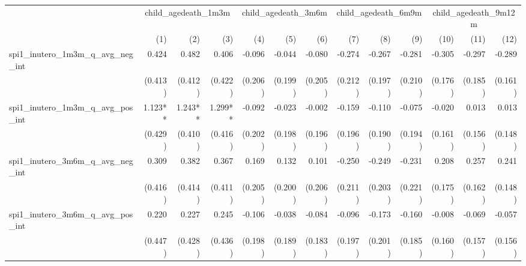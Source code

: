 \begin{tabular}{lrrrrrrrrrrrr}
\toprule
                                            &  \multicolumn{3}{c}{child\_agedeath\_1m3m} &  \multicolumn{3}{c}{child\_agedeath\_3m6m} &  \multicolumn{3}{c}{child\_agedeath\_6m9m} & \multicolumn{3}{c}{child\_agedeath\_9m12m} \\ 
\cmidrule(lr){2-4} \cmidrule(lr){5-7} \cmidrule(lr){8-10} \cmidrule(lr){11-13} 
                                            &          (1) &          (2) &          (3) &          (4) &          (5) &          (6) &          (7) &          (8) &          (9) &         (10) &         (11) &         (12) \\ 
\midrule
spi1\_inutero\_1m3m\_q\_avg\_neg\_int       &        0.424 &        0.482 &        0.406 &       -0.096 &       -0.044 &       -0.080 &       -0.274 &       -0.267 &       -0.281 &       -0.305 &       -0.297 &       -0.289 \\ 
                                            &      (0.413) &      (0.412) &      (0.422) &      (0.206) &      (0.199) &      (0.205) &      (0.212) &      (0.197) &      (0.210) &      (0.176) &      (0.185) &      (0.161) \\ 
spi1\_inutero\_1m3m\_q\_avg\_pos\_int       &      1.123** &      1.243** &      1.299** &       -0.092 &       -0.023 &       -0.002 &       -0.159 &       -0.110 &       -0.075 &       -0.020 &        0.013 &        0.013 \\ 
                                            &      (0.429) &      (0.410) &      (0.416) &      (0.202) &      (0.198) &      (0.196) &      (0.196) &      (0.190) &      (0.194) &      (0.161) &      (0.156) &      (0.148) \\ 
spi1\_inutero\_3m6m\_q\_avg\_neg\_int       &        0.309 &        0.382 &        0.367 &        0.169 &        0.132 &        0.101 &       -0.250 &       -0.249 &       -0.231 &        0.208 &        0.257 &        0.241 \\ 
                                            &      (0.416) &      (0.414) &      (0.411) &      (0.205) &      (0.200) &      (0.206) &      (0.211) &      (0.203) &      (0.221) &      (0.175) &      (0.162) &      (0.148) \\ 
spi1\_inutero\_3m6m\_q\_avg\_pos\_int       &        0.220 &        0.227 &        0.245 &       -0.106 &       -0.038 &       -0.084 &       -0.096 &       -0.173 &       -0.160 &       -0.008 &       -0.069 &       -0.057 \\ 
                                            &      (0.447) &      (0.428) &      (0.436) &      (0.198) &      (0.189) &      (0.183) &      (0.197) &      (0.201) &      (0.185) &      (0.160) &      (0.157) &      (0.156) \\ 

\end{tabular}
